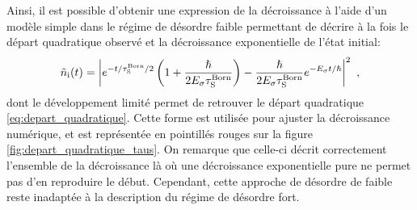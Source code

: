 Ainsi, il est possible d'obtenir une expression de la décroissance à l'aide d'un modèle simple dans le régime de désordre faible \citep{grynberg2010introduction} permettant de décrire à la fois le départ quadratique observé et la décroissance exponentielle de l'état initial:
\begin{equation}
\tilde{n}_{\mathrm{i}}(t)=\left| e^{-t/\tau_{\mathrm{S}}^{\mathrm{Born}}/2} \left(1+\frac{\hslash}{2E_{\sigma}\tau_{\mathrm{S}}^{\mathrm{Born}}} \right) - \frac{\hslash}{2E_{\sigma}\tau_{\mathrm{S}}^{\mathrm{Born}}} e^{-E_{\sigma} t/\hslash}\right|^2 \text{ ,}
\label{eq:depart_quadratique_total}
\end{equation}
dont le développement limité permet de retrouver le départ quadratique \ref{eq:depart_quadratique}. Cette forme est utilisée pour ajuster la décroissance numérique, et est représentée en pointillés rouges sur la figure \ref{fig:depart_quadratique_taus}. On remarque que celle-ci décrit correctement l'ensemble de la décroissance là où une décroissance exponentielle pure ne permet pas d'en reproduire le début. Cependant, cette approche de désordre de faible reste inadaptée à la description du régime de désordre fort.


